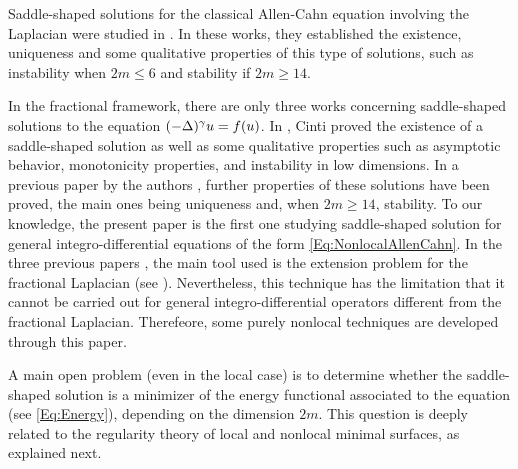 Saddle-shaped solutions for the classical Allen-Cahn equation involving the Laplacian were studied in \cite{DangFifePeletier, Schatzman, CabreTerraI,CabreTerraII, Cabre-Saddle}. In these works, they established the existence, uniqueness and some qualitative properties of this type of solutions, such as instability when $2m\leq 6$ and stability if $2m\geq 14$.


In the fractional framework, there are only three works concerning saddle-shaped solutions to the equation $(-\Delta)^\gamma u = f(u)$. In  \cite{Cinti-Saddle,Cinti-Saddle2}, Cinti proved the existence of a saddle-shaped solution as well as some qualitative properties such as asymptotic behavior, monotonicity properties, and instability in low dimensions. In a previous paper by the authors \cite{Felipe-Sanz-Perela:SaddleFractional}, further properties of these solutions have been proved, the main ones being uniqueness and, when $2m\geq 14$, stability. To our knowledge, the present paper is the first one studying saddle-shaped solution for general integro-differential equations of the form \eqref{Eq:NonlocalAllenCahn}. In the three previous papers \cite{Cinti-Saddle, Cinti-Saddle2, Felipe-Sanz-Perela:SaddleFractional}, the main tool used is the extension problem for the fractional Laplacian (see \cite{CaffarelliSilvestre}). Nevertheless, this technique has the limitation that it cannot be carried out for general integro-differential operators different from the fractional Laplacian. Therefeore, some purely nonlocal techniques are developed through this paper.

A main open problem (even in the local case) is to determine whether the saddle-shaped solution is a minimizer of the energy functional associated to the equation (see \eqref{Eq:Energy}), depending on the dimension $2m$. This question is deeply related to the regularity theory of local and nonlocal minimal surfaces, as explained next.

